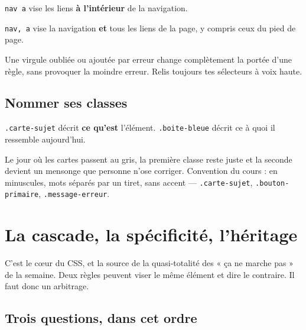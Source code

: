 \documentclass[a4paper,11pt]{article}
\begin{document}
\begin{tcolorbox}[attention, title={L'espace et la virgule ne sont pas interchangeables}]
\texttt{nav a} vise les liens \textbf{à l'intérieur} de la navigation.

\vspace{3pt}
\texttt{nav, a} vise la navigation \textbf{et} tous les liens de la page, y compris ceux du pied de page.

\vspace{3pt}
Une virgule oubliée ou ajoutée par erreur change complètement la portée d'une règle, sans provoquer la moindre erreur. Relis toujours tes sélecteurs à voix haute.
\end{tcolorbox}

\subsection{Nommer ses classes}

\begin{tcolorbox}[astuce, title={Nommer par le rôle, jamais par l'apparence}]
\texttt{.carte-sujet} décrit \textbf{ce qu'est} l'élément. \texttt{.boite-bleue} décrit ce à quoi il ressemble aujourd'hui.

\vspace{3pt}
Le jour où les cartes passent au gris, la première classe reste juste et la seconde devient un mensonge que personne n'ose corriger. Convention du cours : en minuscules, mots séparés par un tiret, sans accent --- \texttt{.carte-sujet}, \texttt{.bouton-primaire}, \texttt{.message-erreur}.
\end{tcolorbox}

\section{La cascade, la spécificité, l'héritage}

C'est le cœur du CSS, et la source de la quasi-totalité des « ça ne marche pas » de la semaine. Deux règles peuvent viser le même élément et dire le contraire. Il faut donc un arbitrage.

\subsection{Trois questions, dans cet ordre}
\end{document}

